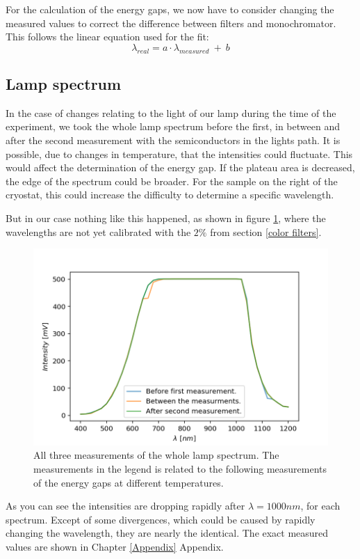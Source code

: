 \documentclass[]{article}
\begin{document}
For the calculation of the energy gaps, we now have to consider changing the measured values to correct the difference between filters and monochromator. This follows the linear equation used for the fit: 
\begin{equation}
\lambda_{real} = a\cdot \lambda_{measured} \ + \ b
\end{equation}

\subsection{Lamp spectrum} \label{lamp spectrum}
In the case of changes relating to the light of our lamp during the time of the experiment, we took the whole lamp spectrum before the first, in between and after the second measurement with the semiconductors in the lights path. It is possible, due to changes in temperature, that the intensities could fluctuate. This would affect the determination of the energy gap. If the plateau area is decreased, the edge of the spectrum could be broader. For the sample on the right of the cryostat, this could increase the difficulty to determine a specific wavelength.

But in our case nothing like this happened, as shown in figure \ref{fig:lamp spectra}, where the wavelengths are not yet calibrated with the $2\%$ from section \ref{color filters}.

\begin{figure}[H]
\centering
\includegraphics[width=.8\textwidth]{Plots/All-Lamp-Spectra.png}
\caption{All three measurements of the whole lamp spectrum. The measurements in the legend is related to the following measurements of the energy gaps at different temperatures.}
\label{fig:lamp spectra}
\end{figure} 

As you can see the intensities are dropping rapidly after  $\lambda =1000nm$, for each spectrum. Except of some divergences, which could be caused by rapidly changing the wavelength, they are nearly the identical. The exact measured values are shown in Chapter \ref{Appendix} Appendix.
\end{document}
